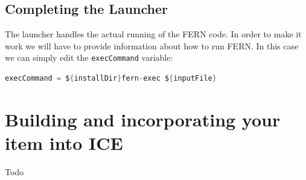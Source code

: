 \documentclass{article} \usepackage{graphicx} \usepackage{hyperref}
\begin{document}
\subsection{Completing the Launcher}
The launcher handles the actual running of the FERN code.  In order to make it work we will have to provide information about how to run FERN.  In this case we can simply edit the \texttt{execCommand} variable:

\begin{lstlisting}[language=java]
execCommand = ${installDir}fern-exec ${inputFile}
\end{lstlisting}

\section{Building and incorporating your item into ICE}
Todo
\end{document}
